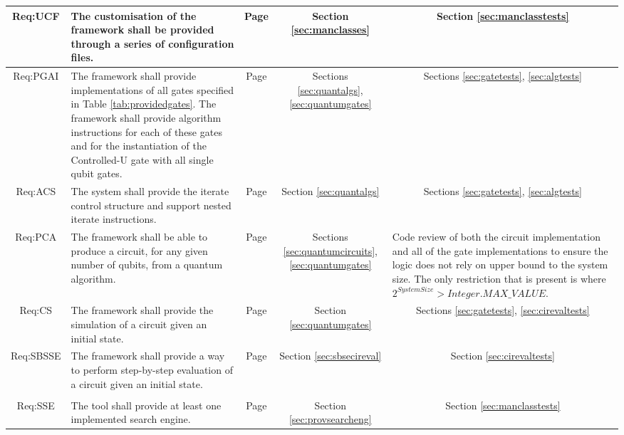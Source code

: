 \begin{landscape}
\begin{longtable}{|c|m{10cm}|c|c|m{4cm}|}
Req:UCF &
The customisation of the framework shall be provided through a series of configuration files. &
Page \pageref{sec:requcf} &
Section \ref{sec:manclasses} &
\multicolumn{1}{c|}{Section \ref{sec:manclasstests}} \\ \hline

Req:PGAI &
The framework shall provide implementations of all gates specified in Table \ref{tab:providedgates}. The framework shall provide algorithm instructions for each of these gates and for the instantiation of the Controlled-U gate with all single qubit gates. &
Page \pageref{sec:reqpgai} &
Sections \ref{sec:quantalgs}, \ref{sec:quantumgates} &
\multicolumn{1}{c|}{Sections \ref{sec:gatetests}, \ref{sec:algtests}} \\ \hline

Req:ACS &
The system shall provide the iterate control structure and support nested iterate instructions. &
Page \pageref{sec:reqacs} &
Section \ref{sec:quantalgs} &
\multicolumn{1}{c|}{Sections \ref{sec:gatetests}, \ref{sec:algtests}} \\ \hline

Req:PCA &
The framework shall be able to produce a circuit, for any given number of qubits, from a quantum algorithm. &
Page \pageref{sec:reqpca} &
Sections \ref{sec:quantumcircuits}, \ref{sec:quantumgates} &
Code review of both the circuit implementation and all of the gate implementations to ensure the logic does not rely on upper bound to the system size.
The only restriction that is present is where $2^{System Size}>Integer.MAX\_VALUE$. \\ \hline

Req:CS &
The framework shall provide the simulation of a circuit given an initial state. &
Page \pageref{sec:reqcs} &
Section \ref{sec:quantumgates} &
\multicolumn{1}{c|}{Sections \ref{sec:gatetests}, \ref{sec:cirevaltests}} \\ \hline

Req:SBSSE &
The framework shall provide a way to perform step-by-step evaluation of a circuit given an initial state. &
Page \pageref{sec:reqsbsse} &
Section \ref{sec:sbsecireval} &
\multicolumn{1}{c|}{Section \ref{sec:cirevaltests}} \\ \hline

&&&&
\\ \hline

Req:SSE &
The tool shall provide at least one implemented search engine. &
Page \pageref{sec:reqsse} &
Section \ref{sec:provsearcheng} &
\multicolumn{1}{c|}{Section \ref{sec:manclasstests}} \\ \hline


\end{longtable}
\end{landscape}
